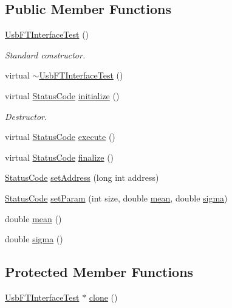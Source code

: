 \subsection*{Public Member Functions}
\begin{DoxyCompactItemize}
\item 
\hyperlink{classUsbFTInterfaceTest_ae83ca1c95a132a896f8c2c0d9a903add}{Usb\+F\+T\+Interface\+Test} ()
\begin{DoxyCompactList}\small\item\em Standard constructor. \end{DoxyCompactList}\item 
virtual \hyperlink{classUsbFTInterfaceTest_a9ae091e623e181994ff8ef8ec7155a14}{$\sim$\+Usb\+F\+T\+Interface\+Test} ()
\item 
virtual \hyperlink{classStatusCode}{Status\+Code} \hyperlink{classUsbFTInterfaceTest_a68831f83830305e65d830c55af16e878}{initialize} ()
\begin{DoxyCompactList}\small\item\em Destructor. \end{DoxyCompactList}\item 
virtual \hyperlink{classStatusCode}{Status\+Code} \hyperlink{classUsbFTInterfaceTest_a1e6d0b0e0c1c58238e78c5b910289b68}{execute} ()
\item 
virtual \hyperlink{classStatusCode}{Status\+Code} \hyperlink{classUsbFTInterfaceTest_a652987fb86a0605842d9a8d7726b8012}{finalize} ()
\item 
\hyperlink{classStatusCode}{Status\+Code} \hyperlink{classUsbFTInterfaceTest_ab9c65d9bc48f205d5dc75e7088474529}{set\+Address} (long int address)
\item 
\hyperlink{classStatusCode}{Status\+Code} \hyperlink{classUsbFTInterfaceTest_a7aec1fc4c65f7079140b69a627f015a3}{set\+Param} (int size, double \hyperlink{classUsbFTInterfaceTest_a8b88ab4c18cff5e8da014ef6fcf39b90}{mean}, double \hyperlink{classUsbFTInterfaceTest_a582fdf03be84fdd791a50a4129ce8938}{sigma})
\item 
double \hyperlink{classUsbFTInterfaceTest_a8b88ab4c18cff5e8da014ef6fcf39b90}{mean} ()
\item 
double \hyperlink{classUsbFTInterfaceTest_a582fdf03be84fdd791a50a4129ce8938}{sigma} ()
\end{DoxyCompactItemize}
\subsection*{Protected Member Functions}
\begin{DoxyCompactItemize}
\item 
\hyperlink{classUsbFTInterfaceTest_1_1UsbFTInterfaceTest}{Usb\+F\+T\+Interface\+Test} $\ast$ \hyperlink{classUsbFTInterfaceTest_af4eae62d10c30e060d19aa48621ffb54}{clone} ()
\end{DoxyCompactItemize}

